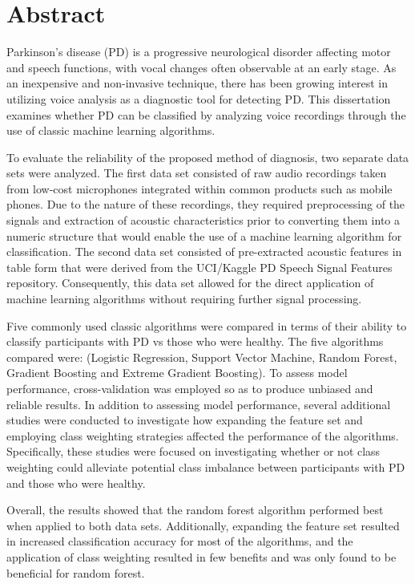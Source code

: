 
\chapter*{Abstract}
Parkinson's disease (PD) is a progressive neurological disorder affecting motor and speech functions, with vocal changes often observable at an early stage. As an inexpensive and non-invasive technique, there has been growing interest in utilizing voice analysis as a diagnostic tool for detecting PD. This dissertation examines whether PD can be classified by analyzing voice recordings through the use of classic machine learning algorithms.

To evaluate the reliability of the proposed method of diagnosis, two separate data sets were analyzed. The first data set consisted of raw audio recordings taken from low-cost microphones integrated within common products such as mobile phones. Due to the nature of these recordings, they required preprocessing of the signals and extraction of acoustic characteristics prior to converting them into a numeric structure that would enable the use of a machine learning algorithm for classification. The second data set consisted of pre-extracted acoustic features in table form that were derived from the UCI/Kaggle PD Speech Signal Features repository. Consequently, this data set allowed for the direct application of machine learning algorithms without requiring further signal processing.

Five commonly used classic algorithms were compared in terms of their ability to classify participants with PD vs those who were healthy. The five algorithms compared were: (Logistic Regression, Support Vector Machine, Random Forest, Gradient Boosting and Extreme Gradient Boosting). To assess model performance, cross-validation was employed so as to produce unbiased and reliable results. In addition to assessing model performance, several additional studies were conducted to investigate how expanding the feature set and employing class weighting strategies affected the performance of the algorithms. Specifically, these studies were focused on investigating whether or not class weighting could alleviate potential class imbalance between participants with PD and those who were healthy.

Overall, the results showed that the random forest algorithm performed best when applied to both data sets. Additionally, expanding the feature set resulted in increased classification accuracy for most of the algorithms, and the application of class weighting resulted in few benefits and was only found to be beneficial for random forest.


